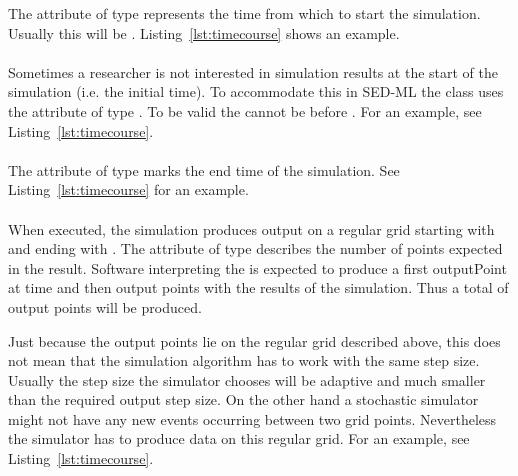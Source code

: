 The attribute  of type  represents the time from which to start the simulation. Usually this will be . Listing~\ref{lst:timecourse} shows an example. 

\paragraph{}

\label{sec:outputStartTime}

Sometimes a researcher is not interested in simulation results at the start of the simulation (i.e. the initial time). To accommodate this in SED-ML the  class uses the  attribute  of type . To be valid the  cannot be before .  For an example, see Listing~\ref{lst:timecourse}. 

\paragraph{}
\label{sec:outputEndTime}

The attribute  of type  marks the end time of the simulation. See Listing~\ref{lst:timecourse} for an example. 

\paragraph{}
\label{sec:numberOfPoints}

When executed, the  simulation produces output on a regular grid starting with  and ending with . The attribute   of type  describes the number of points expected in the result. Software interpreting the  is expected to produce a first outputPoint at time  and then  output points with the results of the simulation. Thus a total of  output points will be produced.

Just because the output points lie on the regular grid described above, this does not mean that the simulation algorithm has to work with the same step size. Usually the step size the simulator chooses will be adaptive and much smaller than the required output step size. On the other hand a stochastic simulator might not have any new events occurring between two grid points. Nevertheless the simulator has to produce data on this regular grid. For an example, see Listing~\ref{lst:timecourse}. 


